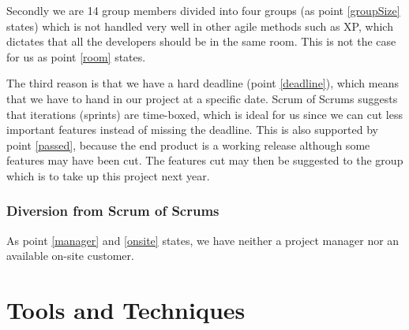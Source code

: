 \documentclass{article}
\begin{document}
Secondly we are 14 group members divided into four groups (as point \ref{groupSize} states) which is not handled very well in other agile methods such as XP, which dictates that all the developers should be in the same room. 
This is not the case for us as point \ref{room} states.

The third reason is that we have a hard deadline (point \ref{deadline}), which means that we have to hand in our project at a specific date.
Scrum of Scrums suggests that iterations (sprints) are time-boxed, which is ideal for us since we can cut less important features instead of missing the deadline.
This is also supported by point \ref{passed}, because the end product is a working release although some features may have been cut.
The features cut may then be suggested to the group which is to take up this project next year.



\subsubsection{Diversion from Scrum of Scrums}
As point \ref{manager} and \ref{onsite} states, we have neither a project manager nor an available on-site customer.


\section{Tools and Techniques}
\end{document}
